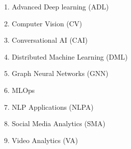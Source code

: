 \begin{enumerate}
    \item Advanced Deep learning (ADL)
    \item Computer Vision (CV)
    \item Conversational AI (CAI)
    \item Distributed Machine Learning (DML)
    \item Graph Neural Networks (GNN)
    \item MLOps
    \item NLP Applications (NLPA)
    \item Social Media Analytics (SMA)
    \item Video Analytics (VA)
\end{enumerate}







